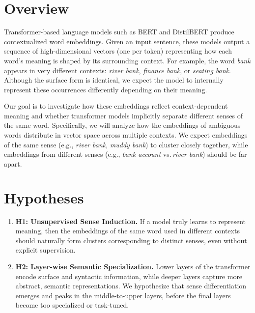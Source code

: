 \documentclass{template}
\begin{document}
\maketitle


\section*{Overview}
Transformer-based language models such as BERT and DistilBERT produce contextualized word embeddings. Given an input sentence, these models output a sequence of high-dimensional vectors (one per token) representing how each word's meaning is shaped by its surrounding context. For example, the word \textit{bank} appears in very different contexts: \textit{river bank}, \textit{finance bank}, or \textit{seating bank}. Although the surface form is identical, we expect the model to internally represent these occurrences differently depending on their meaning.

Our goal is to investigate how these embeddings reflect context-dependent meaning and whether transformer models implicitly separate different senses of the same word. Specifically, we will analyze how the embeddings of ambiguous words distribute in vector space across multiple contexts. We expect embeddings of the same sense (e.g., \textit{river bank}, \textit{muddy bank}) to cluster closely together, while embeddings from different senses (e.g., \textit{bank account} vs.\,\textit{river bank}) should be far apart.


\section*{Hypotheses}
\begin{enumerate}
    \item \textbf{H1: Unsupervised Sense Induction.} If a model truly learns to represent meaning, then the embeddings of the same word used in different contexts should naturally form clusters corresponding to distinct senses, even without explicit supervision.
    \item \textbf{H2: Layer-wise Semantic Specialization.} Lower layers of the transformer encode surface and syntactic information, while deeper layers capture more abstract, semantic representations. We hypothesize that sense differentiation emerges and peaks in the middle-to-upper layers, before the final layers become too specialized or task-tuned.
\end{enumerate}
\end{document}
